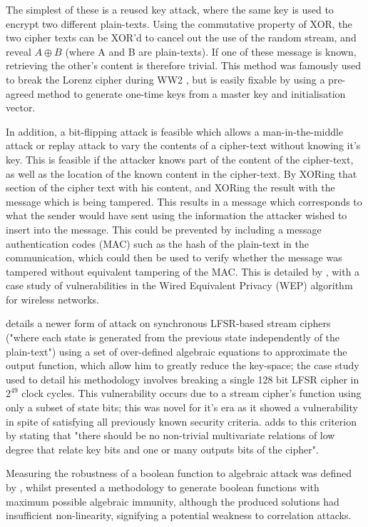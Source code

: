 \documentclass[british,10pt,a4paper]{article}
\begin{document}
The simplest of these is a reused key attack, where the same key is used to encrypt two different plain-texts. Using the commutative property of XOR, the two cipher texts can be XOR'd to cancel out the use of the random stream, and reveal \(A \oplus B\) (where A and B are plain-texts). If one of these message is known, retrieving the other's content is therefore trivial. This method was famously used to break the Lorenz cipher during WW2 \cite{sale}, but is easily fixable by using a pre-agreed method to generate one-time keys from a master key and initialisation vector. 

In addition, a bit-flipping attack is feasible which allows a man-in-the-middle attack or replay attack to vary the contents of a cipher-text without knowing it's key. This is feasible if the attacker knows part of the content of the cipher-text, as well as the location of the known content in the cipher-text. By XORing that section of the cipher text with his content, and XORing the result with the message which is being tampered. This results in a message which corresponds to what the sender would have sent using the information the attacker wished to insert into the message. This could be prevented by including a message authentication codes (MAC) such as the hash of the plain-text in the communication, which could then be used to verify whether the message was tampered without equivalent tampering of the MAC. This is detailed by \citet{Isaacs}, with a case study of vulnerabilities in the Wired Equivalent Privacy (WEP) algorithm for wireless networks.

\citet{courtois} details a newer form of attack on synchronous LFSR-based stream ciphers ("where each state is generated from the previous state independently of the plain-text") using a set of over-defined algebraic equations to approximate the output function, which allow him to greatly reduce the key-space; the case study used to detail his methodology involves breaking a single 128 bit LFSR cipher in \(2^{49}\) clock cycles. This vulnerability occurs due to a stream cipher's function using only a subset of state bits; this was novel for it's era as it showed a vulnerability in spite of satisfying all previously known security criteria. \citeauthor{courtois} adds to this criterion by stating that "there should be no non-trivial multivariate relations of low degree that relate key bits and one or many outputs bits of the cipher". 

Measuring the robustness of a boolean function to algebraic attack was defined by \citet{Armknecht2006-sj}, whilst \citet{carlet} presented a methodology to generate boolean functions with maximum possible algebraic immunity, although the produced solutions had insufficient non-linearity, signifying a potential weakness to correlation attacks.
\end{document}
